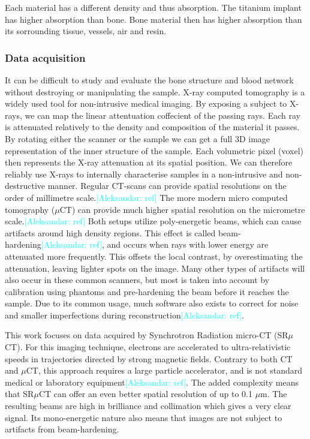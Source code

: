 \documentclass[times,twocolumn,final]{elsarticle}
\newcommand{\aleksandar}[1]{\textcolor{cyan}{[Aleksandar: #1]}}
\begin{document}
Each material has a different density and thus absorption. The titanium implant has higher absorption than bone.
Bone material then has higher absorption than its sorrounding tissue, vessels, air and resin.

\subsubsection*{Data acquisition}

It can be difficult to study and evaluate the bone structure and blood network without destroying or
manipulating the sample. X-ray computed tomography is a widely used tool for non-intrusive medical
imaging. By exposing a subject to X-rays, we can map the linear attentuation coffecient of the passing
rays. Each ray is attenuated relatively to the density and composition of the material it passes. By
rotating either the scanner or the sample we can get a full 3D image representation of the inner
structure of the sample. Each volumetric pixel (voxel) then represents the X-ray attenuation at its spatial position. We can therefore reliably use X-rays to internally characterise samples in a non-intrusive and non-destructive manner. Regular CT-scans can provide spatial resolutions on the order of millimetre scale.\aleksandar{ref} The more modern micro computed tomography ($\mu$CT) can provide much higher spatial resolution on the micrometre scale.\aleksandar{ref} Both setups utilize poly-energetic beams, which can cause artifacts around high density regions. This effect is called beam-hardening\aleksandar{ref}, and occurs when rays with lower energy are attenuated more frequently. This offsets the local contrast, by overestimating the attenuation, leaving lighter spots on the image. Many other types of artifacts will also occur in these common scanners, but most is taken into account by calibration using phantoms and pre-hardening the beam before it reaches the sample. Due to its common usage, much software also exists to correct for noise and smaller imperfections during reconstruction\aleksandar{ref}.

This work focuses on data acquired by Synchrotron Radiation micro-CT (SR$\mu$CT). For this imaging
technique, electrons are accelerated to ultra-relativistic speeds in trajectories directed by strong
magnetic fields. Contrary to both CT and $\mu$CT, this approach requires a large particle accelerator, and is not standard medical or laboratory equipment\aleksandar{ref}. The added complexity means that SR$\mu$CT can offer an even better spatial resolution of up to 0.1 $\mu$m. The resulting beams are high in brilliance and collimation which gives a very clear signal. Its mono-energetic nature also means that images are not subject to artifacts from beam-hardening.
\end{document}
